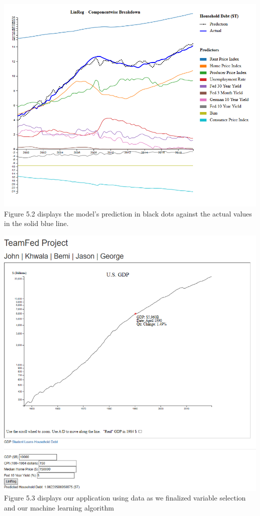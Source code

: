 \documentclass[sigconf,nonacm,11pt]{acmart}
\begin{document}
\includegraphics[scale = 0.28]{linreg.png}
Figure 5.2 displays the model's prediction in black dots against the actual values in the solid blue line. 
\vspace{0.5em}

\includegraphics[scale = 0.59]{teamfed2.PNG}
Figure 5.3 displays our application using data as we finalized variable selection and our machine learning algorithm \vspace{0.75em}
\end{document}
